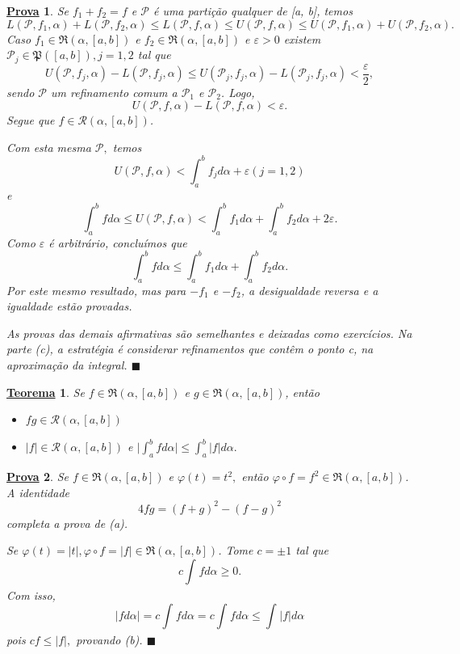 \documentclass{article}
\newtheorem*{theorem*}{\underline{Teorema}}
\newtheorem*{proof*}{\underline{Prova}}
\renewcommand\qedsymbol{$\blacksquare$}
\begin{document}
\begin{proof*}
  Se \(f_1 + f_2 = f\) e \(\mathcal{P}\) é uma partição qualquer de [a, b], temos 
    \[
      L(\mathcal{P}, f_1, \alpha ) + L(\mathcal{P}, f_2, \alpha )\leq L(\mathcal{P}, f, \alpha ) \leq U(\mathcal{P}, f, \alpha ) \leq U(\mathcal{P}, f_1, \alpha ) + U(\mathcal{P}, f_2, \alpha ).
    \] 
    Caso \(f_1\in \mathfrak{R}(\alpha , [a,b])\) e \(f_2\in \mathfrak{R}(\alpha , [a,b])\) e \(\varepsilon > 0\) existem \(\mathcal{P}_{j}\in \mathfrak{P}([a, b]), j = 1, 2\) tal que 
      \[
        U(\mathcal{P}, f_{j}, \alpha ) - L(\mathcal{P}, f_{j}, \alpha )\leq U(\mathcal{P}_{j}, f_{j}, \alpha ) - L(\mathcal{P}_{j}, f_{j}, \alpha ) < \frac{\varepsilon }{2},
      \]
    sendo \(\mathcal{P}\) um refinamento comum a \(\mathcal{P}_1\) e \(\mathcal{P}_2\). Logo, 
      \[
        U(\mathcal{P}, f, \alpha ) - L(\mathcal{P}, f, \alpha ) < \varepsilon .
      \]
    Segue que \(f\in \mathcal{R}(\alpha , [a, b])\). 
 
    Com esta mesma \(\mathcal{P},\) temos 
      \[
        U(\mathcal{P}, f, \alpha ) < \int_{a}^{b} f_{j}d\alpha +\varepsilon (j = 1, 2)
      \]
    e
      \[
        \int_{a}^{b}fd\alpha \leq U(\mathcal{P}, f, \alpha ) < \int_{a}^{b} f_1d\alpha + \int_{a}^{b}f_2d\alpha + 2\varepsilon .
      \]
    Como \(\varepsilon \) é arbitrário, concluímos que 
      \[
        \int_{a}^{b}fd\alpha \leq \int_{a}^{b}f_1d\alpha +\int_{a}^{b}f_2d\alpha .
      \]
    Por este mesmo resultado, mas para \(-f_1\) e \(-f_2\), a desigualdade reversa e a igualdade estão provadas. 

    As provas das demais afirmativas são semelhantes e deixadas como exercícios. Na parte (c), a estratégia é considerar
  refinamentos que contêm o ponto c, na aproximação da integral. \qedsymbol
\end{proof*}
\begin{theorem*}
  Se \(f\in \mathfrak{R}(\alpha , [a, b])\) e \(g\in \mathfrak{R}(\alpha , [a, b])\), então 
  \begin{itemize}
    \item[a)] \(fg\in \mathcal{R}(\alpha , [a,b])\)
    \item[b)] \(|f|\in \mathcal{R}(\alpha , [a,b])\) e \(\biggl\vert \int_{a}^{b}fd\alpha  \biggr\vert\leq \int_{a}^{b}|f|d\alpha .\)
  \end{itemize}
\end{theorem*}
\begin{proof*}
  Se \(f\in \mathfrak{R}(\alpha , [a,b])\) e \(\varphi (t) = t^{2},\) então \(\varphi \circ f = f^{2}\in \mathfrak{R}(\alpha , [a,b])\). A identidade 
    \[
      4fg = (f+g)^{2} - (f-g)^{2}
    \]
  completa a prova de (a).

  Se \(\varphi (t) = |t|, \varphi \circ f = |f|\in \mathfrak{R}(\alpha , [a,b])\). Tome \(c = \pm 1\) tal que 
    \[
      c \int_{}^{}fd\alpha \geq 0.
    \]
  Com isso, 
    \[
      \biggl\vert fd\alpha  \biggr\vert = c \int_{}^{}fd\alpha = c \int_{}^{}fd\alpha \leq \int_{}^{}|f|d\alpha 
    \]
  pois \(cf\leq |f|,\) provando (b). \qedsymbol
\end{proof*}
\newpage 
\end{document}
